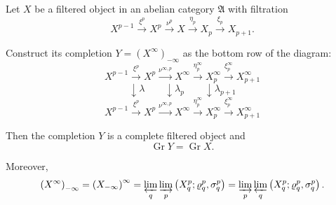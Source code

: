 Let $X$ be a filtered object in an abelian category $\mathfrak{A}$ with filtration
$$X^{p-1} \xrightarrow{\xi^p} X^p \xrightarrow{\nu^p} X \xrightarrow{\eta_p} X_p \xrightarrow{\xi_p} X_{p+1}.$$

Construct its completion $Y = (X^\infty)_{-\infty}$ as the bottom row of the diagram:
$$X^{p-1} \xrightarrow{\xi^p} X^p \xrightarrow{\nu^{\infty, p}} X^\infty \xrightarrow{\eta^\infty_p} X^\infty_p \xrightarrow{\xi^\infty_p} X^\infty_{p+1}$$
$$\downarrow \lambda \qquad \downarrow \lambda_p \qquad \downarrow \lambda_{p+1}$$
$$X^{p-1} \xrightarrow{\xi^p} X^p \xrightarrow{\nu^{\infty, p}} X^\infty \xrightarrow{\eta^\infty_p} X^\infty_p \xrightarrow{\xi^\infty_p} X^\infty_{p+1}$$

Then the completion $Y$ is a complete filtered object and
$$\operatorname{Gr} Y = \operatorname{Gr} X.$$

Moreover,
$$\left(X^\infty\right)_{-\infty} = \left(X_{-\infty}\right)^\infty = \varprojlim_q \varinjlim_p \left(X_q^p; \varrho_q^p, \sigma_q^p\right) = \varinjlim_p \varprojlim_q \left(X_q^p; \varrho_q^p, \sigma_q^p\right).$$
